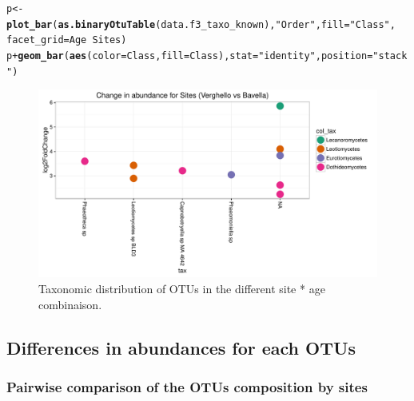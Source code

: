 \documentclass[12pt]{article}\usepackage[]{graphicx}\usepackage[]{color}
\makeatletter
\def\maxwidth{ %
  \ifdim\Gin@nat@width>\linewidth
    \linewidth
  \else
    \Gin@nat@width
  \fi
}
\newcommand{\hlstr}[1]{\textcolor[rgb]{0.192,0.494,0.8}{#1}}%
\newcommand{\hlopt}[1]{\textcolor[rgb]{0,0,0}{#1}}%
\newcommand{\hlstd}[1]{\textcolor[rgb]{0.345,0.345,0.345}{#1}}%
\newcommand{\hlkwb}[1]{\textcolor[rgb]{0.69,0.353,0.396}{#1}}%
\newcommand{\hlkwc}[1]{\textcolor[rgb]{0.333,0.667,0.333}{#1}}%
\newcommand{\hlkwd}[1]{\textcolor[rgb]{0.737,0.353,0.396}{\textbf{#1}}}%
\newenvironment{kframe}{%
 \def\at@end@of@kframe{}%
 \ifinner\ifhmode%
  \def\at@end@of@kframe{\end{minipage}}%
  \begin{minipage}{\columnwidth}%
 \fi\fi%
 \def\FrameCommand##1{\hskip\@totalleftmargin \hskip-\fboxsep
 \colorbox{shadecolor}{##1}\hskip-\fboxsep
     \hskip-\linewidth \hskip-\@totalleftmargin \hskip\columnwidth}%
 \MakeFramed {\advance\hsize-\width
   \@totalleftmargin\z@ \linewidth\hsize
   \@setminipage}}%
 {\par\unskip\endMakeFramed%
 \at@end@of@kframe}
\newenvironment{knitrout}{}{} %
\numberwithin{figure}{section}
\makeatother
\begin{document}
\begin{landscape}
\begin{knitrout}\small
{}\color{fgcolor}\begin{kframe}
\begin{alltt}
\hlstd{p} \hlkwb{<-} \hlkwd{plot_bar}\hlstd{(}\hlkwd{as.binaryOtuTable}\hlstd{(data.f3_taxo_known),} \hlstr{"Order"}\hlstd{,} \hlkwc{fill} \hlstd{=} \hlstr{"Class"}\hlstd{,}
              \hlkwc{facet_grid} \hlstd{= Age} \hlopt{~} \hlstd{Sites)}
\hlstd{p} \hlopt{+} \hlkwd{geom_bar}\hlstd{(}\hlkwd{aes}\hlstd{(}\hlkwc{color} \hlstd{= Class,} \hlkwc{fill} \hlstd{= Class),} \hlkwc{stat} \hlstd{=} \hlstr{"identity"}\hlstd{,} \hlkwc{position} \hlstd{=} \hlstr{"stack"}\hlstd{)}
\end{alltt}
\end{kframe}\begin{figure}

{\centering \includegraphics[width=\maxwidth]{figure/unnamed-chunk-70-1} 

}

\caption[Taxonomic distribution of OTUs in the different site * age combinaison]{Taxonomic distribution of OTUs in the different site * age combinaison.}\label{fig:unnamed-chunk-70}
\end{figure}


\end{knitrout}
\end{landscape}


  \subsection{Differences in abundances for each OTUs}
    \subsubsection{Pairwise comparison of the OTUs composition by sites}
\end{document}
